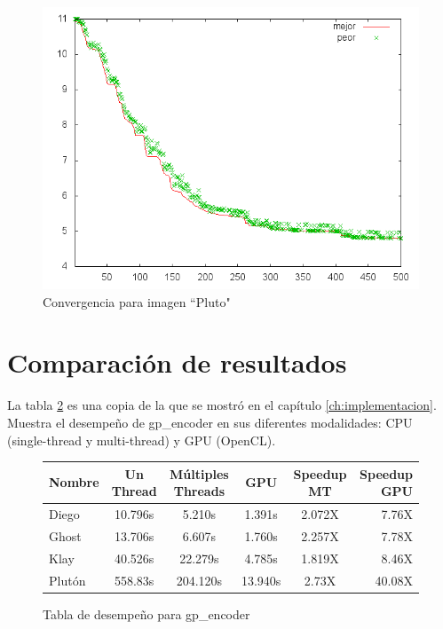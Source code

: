 \begin{figure}[b]
    \includegraphics[width=1.0\textwidth]{plot_pluto}
    \caption{Convergencia para imagen ``Pluto"}
    \label{img:plot-pluto}
\end{figure}

\section{Comparación de resultados}

La tabla \ref{fig:perf_table} es una copia de la que se mostró en el capítulo
\ref{ch:implementacion}. Muestra el desempeño de gp\_encoder en sus
diferentes modalidades: CPU (single-thread y multi-thread) y GPU (OpenCL).

\begin{figure}[h!]
    \begin{tabular}{ |l c c c c r| }
        \hline
        Nombre &  Un Thread & Múltiples Threads & GPU & Speedup MT & Speedup GPU \\
        \hline
        Diego & 10.796s & 5.210s & 1.391s  & 2.072X & 7.76X \\
        Ghost & 13.706s & 6.607s & 1.760s  & 2.257X & 7.78X \\
        Klay & 40.526s & 22.279s & 4.785s  & 1.819X & 8.46X \\%
        Plutón & 558.83s & 204.120s & 13.940s & 2.73X & 40.08X \\ %
        \hline
    \end{tabular}
    \caption{Tabla de desempeño para gp\_encoder}
    \label{fig:perf_table}
\end{figure}

